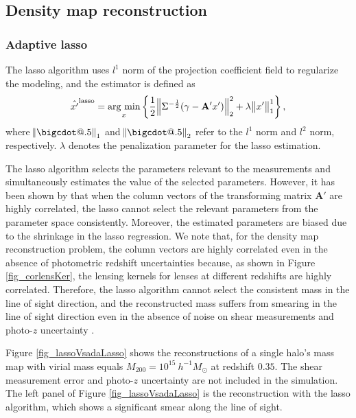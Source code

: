 \documentclass[twocolumn]{aastex63}
\makeatletter
\newcommand*\bigcdot{\mathpalette\bigcdot@{.5}}
\newcommand*\bigcdot@[2]{\mathbin{\vcenter{\hbox{\scalebox{#2}{$\m@th#1\bullet$}}}}}
\newcommand{\argmin}{\mathop{\rm arg~min}\limits}
\makeatother
\begin{document}
\subsection{Density map reconstruction}
\label{subsec_method_reconstruction}

\subsubsection{Adaptive lasso}

The lasso algorithm uses $l^1$ norm of the projection coefficient field to
regularize the modeling, and the estimator is defined as
\begin{equation}
\hat{x'}^{\rm{lasso}}=\argmin_{x} \left\{
\frac{1}{2}\norm{\Sigma^{-\frac{1}{2}}(\gamma- \mathbf{A'} x')}_2^2+
\lambda \norm{x'}^1_1\right\},
\end{equation}
where $\norm{\bigcdot}_1$ and $\norm{\bigcdot}_2$ refer to the $l^1$ norm and
$l^2$ norm, respectively.  $\lambda$ denotes the penalization parameter
for the lasso estimation.

The lasso algorithm selects the parameters relevant to the measurements and
simultaneously estimates the value of the selected parameters.  However, it has
been shown by \citet{AdaLASSO-Zou2006} that when the column vectors of the
transforming matrix $\mathbf{A'}$ are highly correlated, the lasso cannot
select the relevant parameters from the parameter space consistently.
Moreover, the estimated parameters are biased due to the shrinkage in the lasso
regression. We note that, for the density map reconstruction problem, the
column vectors are highly correlated even in the absence of photometric
redshift uncertainties because, as shown in Figure \ref{fig_corlensKer}, the
lensing kernels for lenses at different redshifts are highly correlated.
Therefore, the lasso algorithm cannot select the consistent mass in the line of
sight direction, and the reconstructed mass suffers from smearing in the line
of sight direction even in the absence of noise on shear measurements and
photo-$z$ uncertainty .

Figure \ref{fig_lassoVsadaLasso} shows the reconstructions of a single halo's
mass map with virial mass equals $M_{200}=10^{15} ~h^{-1}M_{\odot}$ at redshift
$0.35$. The shear measurement error and photo-$z$ uncertainty are not included
in the simulation.  The left panel of Figure \ref{fig_lassoVsadaLasso} is the
reconstruction with the lasso algorithm, which shows a significant smear along
the line of sight.
\end{document}
